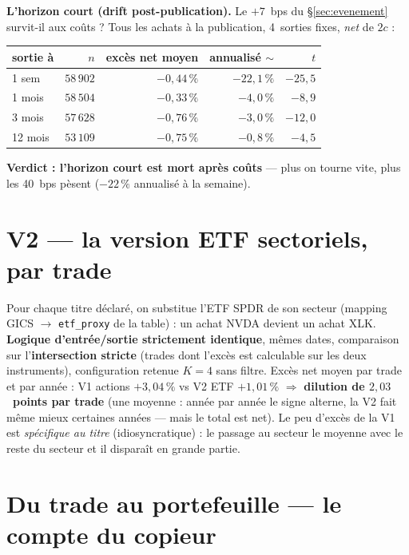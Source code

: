 \documentclass[11pt,a4paper]{article}
\newcommand{\code}[1]{\texttt{\small #1}}
\begin{document}
\textbf{L'horizon court (drift post-publication).} Le $+7$~bps du \S\ref{sec:evenement} survit-il aux
coûts ? Tous les achats à la publication, 4~sorties fixes, \emph{net} de $2c$ :
\begin{center}\small
\begin{tabular}{lrrrr}
\toprule
sortie à & $n$ & excès net moyen & annualisé $\sim$ & $t$ \\
\midrule
1 sem & $58\,902$ & $-0{,}44\,\%$ & $-22{,}1\,\%$ & $-25{,}5$ \\
1 mois & $58\,504$ & $-0{,}33\,\%$ & $-4{,}0\,\%$ & $-8{,}9$ \\
3 mois & $57\,628$ & $-0{,}76\,\%$ & $-3{,}0\,\%$ & $-12{,}0$ \\
12 mois & $53\,109$ & $-0{,}75\,\%$ & $-0{,}8\,\%$ & $-4{,}5$ \\
\bottomrule
\end{tabular}
\end{center}
\textbf{Verdict : l'horizon court est mort après coûts} --- plus on tourne vite, plus les 40~bps pèsent
($-22\,\%$ annualisé à la semaine).

\section{V2 --- la version ETF sectoriels, par trade}\label{sec:v2}

Pour chaque titre déclaré, on substitue l'ETF SPDR de son secteur (mapping GICS $\to$ \code{etf\_proxy}
de la table) : un achat NVDA devient un achat XLK. \textbf{Logique d'entrée/sortie strictement identique},
mêmes dates, comparaison sur l'\textbf{intersection stricte} (trades dont l'excès est calculable sur les
deux instruments), configuration retenue $K=4$ sans filtre. Excès net moyen par trade et par année :
V1 actions \textbf{$+3{,}04\,\%$} vs V2 ETF \textbf{$+1{,}01\,\%$}
$\Rightarrow$ \textbf{dilution de $2{,}03$~points par trade} (une moyenne : année par année le signe
alterne, la V2 fait même mieux certaines années --- mais le total est net). Le peu d'excès de la V1 est
\emph{spécifique au titre} (idiosyncratique) : le passage au secteur le moyenne avec le reste du secteur
et il disparaît en grande partie.

\section{Du trade au portefeuille --- le compte du copieur}\label{sec:ptf}
\end{document}
